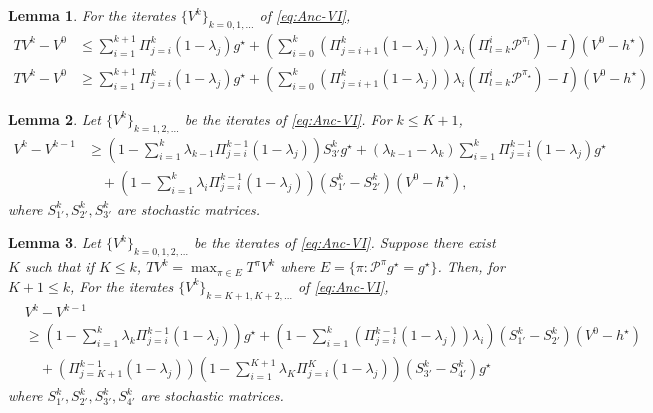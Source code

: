 \documentclass[10pt,a4paper]{amsart}
\newtheorem{lemma}{Lemma}
\newcommand{\cP}{\mathcal{P}}
\newcommand*{\para}[1]{\left({#1}\right)}
\begin{document}
\begin{lemma}\label{lem::anc_bellman}
For the iterates $\{V^k\}_{k=0,1,\dots}$ of \ref{eq:Anc-VI},
 \begin{align*} 
      TV^k-V^0 &\le \sum_{i=1}^{k+1} \Pi^{k}_{j=i} (1-\lambda_j)g^{\star} +\para{\sum_{i=0}^{k} (\Pi^k_{j=i+1} (1-\lambda_j)) \lambda_{i}\para{\Pi^{i}_{l=k}\cP^{\pi_l}}-I}(V^0-h^{\star})
    \\TV^k-V^0 &\ge \sum_{i=1}^{k+1} \Pi^{k}_{j=i} (1-\lambda_j)g^{\star}+\para{\sum_{i=0}^{k} (\Pi^k_{j=i+1} (1-\lambda_j)) \lambda_{i}\para{\Pi^{i}_{l=k}\cP^{\pi_{\star}}}-I}(V^0-h^{\star})
  \end{align*} 
\end{lemma}

\begin{lemma}\label{lem::anc_lower_bound_N}
Let $\{V^k\}_{k=1,2,\dots}$ be the iterates of \ref{eq:Anc-VI}. For $k \le K+1$, 
\begin{align*}
V^k-V^{k-1} &\ge \para{1-\sum_{i=1}^{k} \lambda_{k-1} \Pi^{k-1}_{j=i} (1-\lambda_j)}S_{3'}^{k}g^{\star} +(\lambda_{k-1}-\lambda_{k})  \sum_{i=1}^{k} \Pi^{k-1}_{j=i} (1-\lambda_j)g^{\star}
\\& \quad + \para{1-\sum_{i=1}^{k} \lambda_i \Pi^{k-1}_{j=i} (1-\lambda_j)}(S^{k}_{1'} -S^{k}_{2'})(V^0-h^{\star}),
\end{align*}
where $S_{1'}^k,S_{2'}^k,S_{3'}^k$ are stochastic matrices. 
\end{lemma}    

\begin{lemma}\label{lem::anc_lower_bd}
Let $\{V^k\}_{k=0, 1,2,\dots}$ be the iterates of \ref{eq:Anc-VI}.  Suppose there exist $K$ such that if $K \le k$,
 $TV^k=\max_{\pi \in E}T^{\pi}V^k $ where $E = \{\pi: \cP^{\pi}g^{\star}= g^{\star}\}$. Then, for $ K+1 \le k$, For the iterates $\{V^k\}_{k=K+1,K+2,\dots}$ of \ref{eq:Anc-VI},
\begin{align*}
    &V^k-V^{k-1} 
    \\&\ge \para{1-\sum_{i=1}^{k} \lambda_k \Pi^{k-1}_{j=i} (1-\lambda_j)}g^{\star}+ \para{1-\sum_{i=1}^{k}  \para{\Pi^{k-1}_{j=i} (1-\lambda_j)}\lambda_i}(S^{k}_{1'} -S^{k}_{2'})(V^0-h^{\star})
    \\& \quad +\para{\Pi^{k-1}_{j=K+1} (1-\lambda_j)}\para{1-\sum_{i=1}^{K+1} \lambda_{K} \Pi^{K}_{j=i} (1-\lambda_j)}(S^{k}_{3'}-S^{k}_{4'})g^{\star}
\end{align*}   
where $S^{k}_{1'},S^{k}_{2'}, S^{k}_{3'},S^{k}_{4'}$ are stochastic matrices.
\end{lemma}
\end{document}

